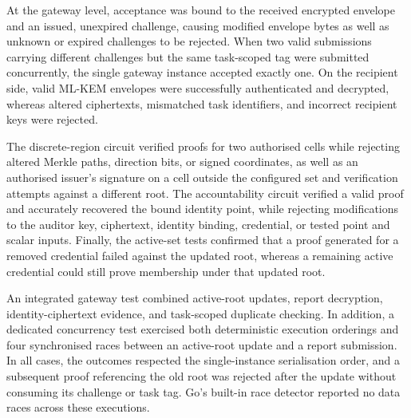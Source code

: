 \documentclass[pdflatex,iicol,sn-mathphys-num]{sn-jnl}
\begin{document}
At the gateway level, acceptance was bound to the received encrypted envelope and an issued, unexpired challenge, causing modified envelope bytes as well as unknown or expired challenges to be rejected. When two valid submissions carrying different challenges but the same task-scoped tag were submitted concurrently, the single gateway instance accepted exactly one. On the recipient side, valid ML-KEM envelopes were successfully authenticated and decrypted, whereas altered ciphertexts, mismatched task identifiers, and incorrect recipient keys were rejected.

The discrete-region circuit verified proofs for two authorised cells while rejecting altered Merkle paths, direction bits, or signed coordinates, as well as an authorised issuer's signature on a cell outside the configured set and verification attempts against a different root. The accountability circuit verified a valid proof and accurately recovered the bound identity point, while rejecting modifications to the auditor key, ciphertext, identity binding, credential, or tested point and scalar inputs. Finally, the active-set tests confirmed that a proof generated for a removed credential failed against the updated root, whereas a remaining active credential could still prove membership under that updated root.

An integrated gateway test combined active-root updates, report decryption, identity-ciphertext evidence, and task-scoped duplicate checking. In addition, a dedicated concurrency test exercised both deterministic execution orderings and four synchronised races between an active-root update and a report submission. In all cases, the outcomes respected the single-instance serialisation order, and a subsequent proof referencing the old root was rejected after the update without consuming its challenge or task tag. Go's built-in race detector reported no data races across these executions.
\end{document}
